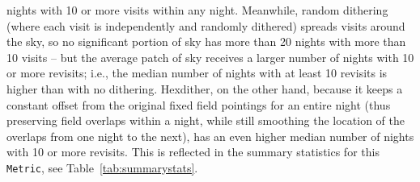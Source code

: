 \documentclass[]{spie}  %
\begin{document}
nights with 10 or more visits within any night. Meanwhile, random dithering (where
each visit is independently and randomly dithered) spreads visits
around the sky, so no significant portion of sky has more than 20
nights with more than 10 visits -- but the average patch of sky
receives a larger number of nights with 10 or more revisits; i.e., the median number of nights with
at least 10 revisits is higher than with no dithering. Hexdither, on the other hand, because it
keeps a constant offset from the original fixed field pointings for an
entire night (thus preserving field overlaps within a night, while
still smoothing the location of the overlaps from one night to the
next), has an even higher median number of nights with 10 or more
revisits. This is reflected in the summary statistics for this {\tt Metric},
see Table~\ref{tab:summarystats}. 
\end{document}
